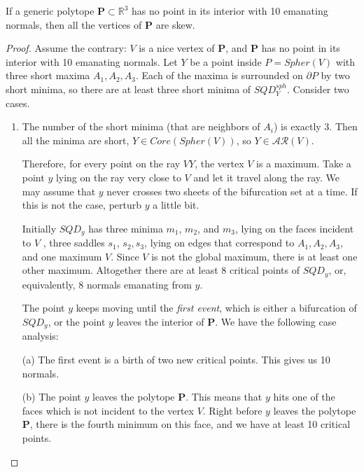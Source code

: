 \documentclass[10pt,a4paper]{amsart}
\begin{document}
\begin{prop} \label{propNice}

If a generic polytope $\mathbf{P}\subset \mathbb{R}^3$ has no point in its interior with 10  emanating normals, then all the vertices of  $\mathbf{P}$ are skew.

\end{prop}

\begin{proof}

Assume the contrary: $V$ is a nice vertex of $\mathbf{P}$, and $\mathbf{P}$ has no point in its interior with 10  emanating normals. Let $Y$ be a point inside $P = Spher(V)$ with three short maxima $A_1, A_2,A_3$. Each of the maxima is surrounded on $\partial P$ by two short minima, so there are at least three short minima of $SQD^{sph}_Y$.  Consider two cases. 

\begin{enumerate}
    \item The number of the short minima (that are neighbors of $A_i$) is exactly $3$. Then all the minima are short, 
 $Y\in Core(Spher(V))$, so $Y\in \mathcal{AR}(V)$.

     Therefore,
for every point on the ray $VY$, the vertex $V$ is a  maximum. Take a point $y$ lying
on the ray very close to $V$ and let it travel along the ray. We may assume that $y$ never crosses two sheets of the bifurcation set at a time. If this is not the case, perturb $y$ a little bit. 

 Initially $SQD_y$ 
has  three minima $m_1$, $m_2$, and $m_3$, lying on the faces incident
to $V$ , three saddles $s_1$, $s_2, s_3$, lying on edges that correspond to $A_1, A_2, A_3$, and one maximum $V$.  Since $V$ is not
 the global maximum, there is at least one other maximum. Altogether there are at least 8 critical points of $SQD_y$, or, equivalently,
8 normals emanating from $y$.

The point $y$ keeps moving until the \textit{first event},  which is either a bifurcation of $SQD_y$,  or  the point $y$ leaves the
interior of $\mathbf{P}$. We have the following case analysis:




(a) The first event is a birth of two new critical points. This gives us 10 normals.

(b)
The point $y$ leaves the polytope $\mathbf{P}$. This means that $y$ hits one
of the faces which is not incident to the vertex $V$. Right before
$y$ leaves the polytope $\mathbf{P}$, there is the  fourth minimum on this face, and we have at least 10 critical points.


\end{enumerate}
\end{proof}
\end{document}
